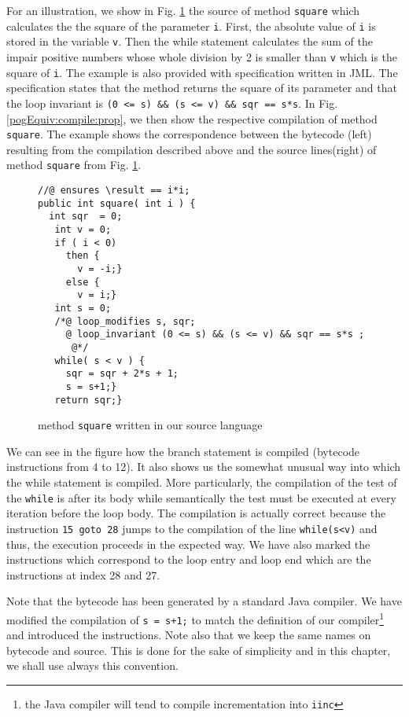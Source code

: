 For an illustration, we show in Fig. \ref{pogComp:source:example} the source of method \lstinline!square! which calculates the 
the   square of the parameter \lstinline!i!.  First, the absolute value of \lstinline!i! is stored in the variable \lstinline!v!.
Then  the while statement  calculates the sum of the impair positive numbers whose whole division by 2 is smaller than
\lstinline!v! which is the square of \lstinline!i!.  The example is also
provided with specification written in JML. The specification states
that the method returns the square of its parameter and that the loop
invariant is \lstinline!(0 <= s) && (s <= v) && sqr == s*s!. In Fig. \ref{pogEquiv:compile:prop}, we 
then show the respective compilation of method \lstinline!square!.
The example shows the correspondence between  the bytecode (left) resulting from the compilation described above and the source lines(right)
 of method  \lstinline!square! from Fig. \ref{pogComp:source:example}.



\begin{figure}[ht!]
 \begin{lstlisting}[frame=trbl] 
//@ ensures \result == i*i; 
public int square( int i ) {
  int sqr  = 0;
   int v = 0;
   if ( i < 0)
     then {
       v = -i;} 
     else {
       v = i;}
   int s = 0;
   /*@ loop_modifies s, sqr;
     @ loop_invariant (0 <= s) && (s <= v) && sqr == s*s ;
      @*/
   while( s < v ) {
     sqr = sqr + 2*s + 1;
     s = s+1;}
   return sqr;}
 \end{lstlisting}
 \caption{\sc method  \lstinline!square! written in our source language}
 \label{pogComp:source:example}
 \end{figure}


We can see in the figure how the branch statement is compiled (bytecode instructions from 4 to 12).
 It also shows us the somewhat unusual way into which 
the while statement is compiled. More particularly, the compilation of the test of the \lstinline!while! is after its body while semantically the test must be executed 
at every iteration before the loop body.  The compilation is actually correct because the instruction 
\lstinline!15 goto 28! jumps to the compilation of the line \lstinline!while(s<v)! and thus, the execution proceeds in the expected way.
 We have also marked the instructions which correspond to the loop entry and loop end  which are the instructions at index 28 and 27. 
 

Note that the bytecode has been generated by a standard Java compiler. We have modified the compilation of  \lstinline!s = s+1;! to match the definition 
of our compiler\footnote{the Java compiler will tend to compile incrementation into \lstinline!iinc!} and introduced the \nop{} instructions.
 Note also that we keep the same names on bytecode and source. This is done for the sake of simplicity and in this chapter, we shall use always this convention.

